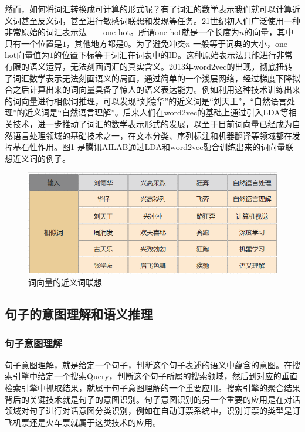 \documentclass[twoside,a4paper,12pt]{book}%
\begin{document}
然而，如何将词汇转换成可计算的形式呢？有了词汇的数学表示我们就可以计算近义词甚至反义词，甚至进行敏感词联想和发现等任务。21世纪初人们广泛使用一种非常原始的词汇表示法——one-hot。所谓one-hot就是一个长度为$n$的向量，其中只有一个位置是$1$，其他地方都是$0$。为了避免冲突$n$
一般等于词典的大小，one-hot向量值为$1$的位置下标等于词汇在词表中的ID。这种原始表示法只能进行非常有限的语义运算，无法刻画词汇的真实含义。2013年word2vec的出现，彻底扭转了词汇数学表示无法刻画语义的局面，通过简单的一个浅层网络，经过梯度下降拟合之后计算出来的词向量具备了惊人的语义表达能力。例如利用这种技术训练出来的词向量进行相似词推理，可以发现“刘德华”的近义词是“刘天王”，“自然语言处理”的近义词是“自然语言理解”。后来人们在word2vec的基础上通过引入\gls{LDA}等相关技术，进一步推动了词汇的数学表示形式的发展，以至于目前词向量已经成为自然语言处理领域的基础技术之一，在文本分类、序列标注和机器翻译等领域都在发挥基石性作用。图\ref{fig:history1.png} 是腾讯AILAB通过\gls{LDA}和word2vec融合训练出来的词向量联想近义词的例子。
\begin{figure}[htbp]
\begin{center}
\includegraphics[width=5.5in]{figures/history1.png}
\caption{词向量的近义词联想} \label{fig:history1.png}
\end{center}
\end{figure}

\subsection{句子的意图理解和语义推理}
\subsubsection{句子意图理解}
句子意图理解，就是给定一个句子，判断这个句子表述的语义中蕴含的意图。在搜索引擎中给定一个搜索Query，判断这个句子所属的搜索领域，然后到对应的垂直检索引擎中抓取结果，就属于句子意图理解的一个重要应用。搜索引擎的聚合结果背后的关键技术就是句子的意图识别。句子意图识别的另一个重要的应用是在对话领域对句子进行对话意图分类识别，例如在自动订票系统中，识别订票的类型是订飞机票还是火车票就属于这类技术的应用。
\end{document}
